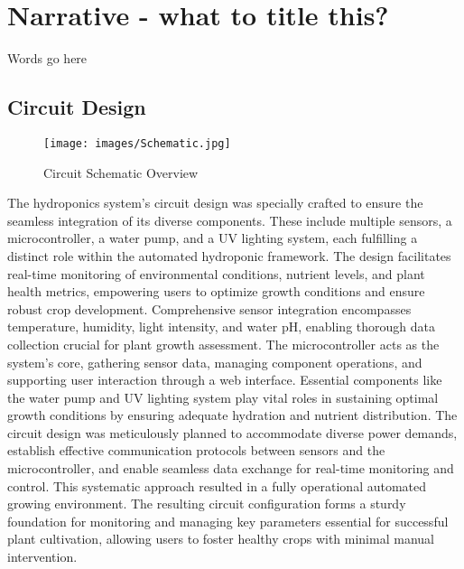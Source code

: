 \documentclass[12pt]{article}
\begin{document}
\section{Narrative - what to title this?}
\noindent  Words go here

\subsection{Circuit Design}
\noindent

\begin{figure}[H]
    \centering
    \texttt{[image: images/Schematic.jpg]}
    \caption{Circuit Schematic Overview}
    \label{fig:Schematic_Full}
\end{figure}

\noindent The hydroponics system's circuit design was specially crafted to ensure the seamless integration of its diverse components. These include multiple sensors, a microcontroller, a water pump, and a UV lighting system, each fulfilling a distinct role within the automated hydroponic framework. The design facilitates real-time monitoring of environmental conditions, nutrient levels, and plant health metrics, empowering users to optimize growth conditions and ensure robust crop development.
\newline
\newline
\noindent Comprehensive sensor integration encompasses temperature, humidity, light intensity, and water pH, enabling thorough data collection crucial for plant growth assessment. The microcontroller acts as the system's core, gathering sensor data, managing component operations, and supporting user interaction through a web interface. Essential components like the water pump and UV lighting system play vital roles in sustaining optimal growth conditions by ensuring adequate hydration and nutrient distribution.
\newline
\newline
\noindent The circuit design was meticulously planned to accommodate diverse power demands, establish effective communication protocols between sensors and the microcontroller, and enable seamless data exchange for real-time monitoring and control. This systematic approach resulted in a fully operational automated growing environment. The resulting circuit configuration forms a sturdy foundation for monitoring and managing key parameters essential for successful plant cultivation, allowing users to foster healthy crops with minimal manual intervention.
\newline
\end{document}
